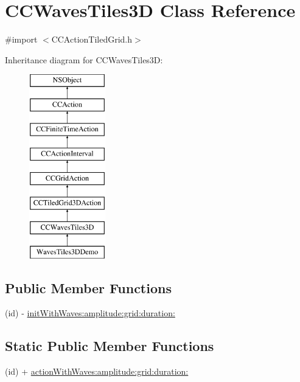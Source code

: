 \hypertarget{interface_c_c_waves_tiles3_d}{\section{C\-C\-Waves\-Tiles3\-D Class Reference}
\label{interface_c_c_waves_tiles3_d}
}


{\ttfamily \#import $<$C\-C\-Action\-Tiled\-Grid.\-h$>$}

Inheritance diagram for C\-C\-Waves\-Tiles3\-D\-:\begin{figure}[H]
\begin{center}
\leavevmode
\includegraphics[height=8.000000cm]{interface_c_c_waves_tiles3_d}
\end{center}
\end{figure}
\subsection*{Public Member Functions}
\begin{DoxyCompactItemize}
\item 
(id) -\/ \hyperlink{interface_c_c_waves_tiles3_d_aaef57be65c288f7818446c5bc7f9e97e}{init\-With\-Waves\-:amplitude\-:grid\-:duration\-:}
\end{DoxyCompactItemize}
\subsection*{Static Public Member Functions}
\begin{DoxyCompactItemize}
\item 
(id) + \hyperlink{interface_c_c_waves_tiles3_d_aedfe7db0740d92ae4259252cd0b79b53}{action\-With\-Waves\-:amplitude\-:grid\-:duration\-:}
\end{DoxyCompactItemize}
